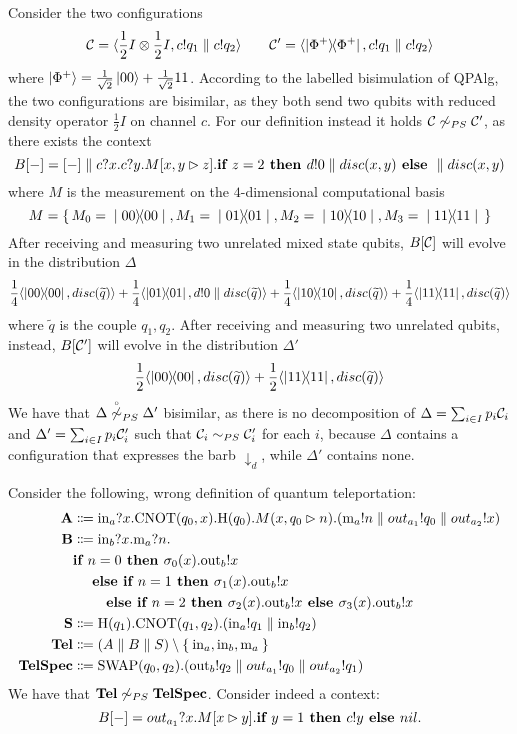 Consider the two configurations
\[ \mathcal{C} = \langle\frac{1}{2}I \otimes \frac{1}{2}I, c!q_1 \parallel c!q_2\rangle \qquad \mathcal{C}' = \langle\ket{\Phi^+}\!\!\bra{\Phi^+}, c!q_1 \parallel c!q_2\rangle
\] where $\ket{\Phi^+} = \frac{1}{\sqrt{2}}\ket{00} + \frac{1}{\sqrt{2}}{11}$. According to the labelled bisimulation of QPAlg, the two configurations are bisimilar, as they both send two qubits with reduced density operator $\frac{1}{2}I$ on channel $c$. For our definition instead it holds $\mathcal{C} \not\sim_{PS} \mathcal{C}'$, as there exists the context \[B[{-}] = [{-}]\parallel c?x.c?y.M[x, y \rhd z].\textbf{if } z = 2 \textbf{ then } d!0 \parallel disc(x, y) \textbf{ else } \parallel disc(x, y)\] where $M$ is the measurement on the $4$-dimensional computational basis \[M = \set{M_0 = \proj{00}, M_1 = \proj{01}, M_2 = \proj{10}, M_3 = \proj{11}}\]
After receiving and measuring two unrelated mixed state qubits, $B[\mathcal{C}]$ will evolve in the distribution  $\Delta$
\[ \frac{1}{4}\confw{\proj{00}, disc(\widetilde{q})} + \frac{1}{4}\confw{\proj{01}, d!0 \parallel disc(\widetilde{q})} + \frac{1}{4}\confw{\proj{10}, disc(\widetilde{q})} + \frac{1}{4}\confw{\proj{11}, disc(\widetilde{q})} \] where $\widetilde{q}$ is the couple $q_1, q_2$.
After receiving and measuring two unrelated qubits, instead, $B[\mathcal{C}']$ will evolve in the distribution $\Delta'$
\[ \frac{1}{2}\langle\ket{00}\!\!\bra{00}, disc(\widetilde{q})\rangle +  \frac{1}{2}\langle\ket{11}\!\!\bra{11}, disc(\widetilde{q})\rangle \] 
We have that $\Delta \stackrel{\scriptscriptstyle \circ}{\not\sim}_{PS} \Delta'$ bisimilar, as there is no decomposition of $\Delta = \sum_{i\in I} p_i \mathcal{C}_i$ and $\Delta' = \sum_{i\in I} p_i \mathcal{C}_i'$ such that $\mathcal{C}_i \sim_{PS} \mathcal{C}_i'$ for each $i$, because $\Delta$ contains a configuration that expresses the barb $\downarrow_d$, while $\Delta'$ contains none.


\begin{example}
	Consider the following, wrong definition of quantum teleportation:
	\begin{align*}
		\text{\textbf{A}} &\Coloneqq \text{in}_a?x.\text{CNOT}(q_0, x).\text{H}(q_0).M(x,q_0 \rhd n).(\text{m}_a!n \parallel out_{a_1}! q_0 \parallel out_{a_2}! x )\\
    \text{\textbf{B}} &\Coloneqq \text{in}_b?x.\text{m}_a?n.
       \\ & \textbf{if } n = 0 \textbf{ then } \sigma_0(x).\text{out}_b!x\\&\quad \textbf{ else } \textbf{if } n = 1 \textbf{ then } \sigma_1(x).\text{out}_b!x\\&\qquad \textbf{ else } \textbf{if } n = 2 \textbf{ then } \sigma_2(x).\text{out}_b!x \textbf{ else } \sigma_3(x).\text{out}_b!x
      \\
		\text{\textbf{S}} &\Coloneqq \text{H}(q_1).\text{CNOT}(q_1, q_2).(\text{in}_a!q_1 \parallel \text{in}_b!q_2) \\
		\text{\textbf{Tel}} &\Coloneqq (A \parallel B \parallel S) \setminus \Set{\text{in}_a, \text{in}_b, \text{m}_a } \\
		\text{\textbf{TelSpec}} &\Coloneqq \text{SWAP}(q_0,q_2).(\text{out}_b!q_2 \parallel out_{a_1}! q_0 \parallel out_{a_2}! q_1)
	\end{align*}
	We have that $\text{\textbf{Tel}} \not\sim_{PS} \text{\textbf{TelSpec}}$.
	Consider indeed a context:
  \[ B[{-}] = out_{a_1} ? x . M[x \rhd y] . \textbf{if } y = 1 \textbf{ then } c!y \textbf{ else } nil. \]
\end{example}


